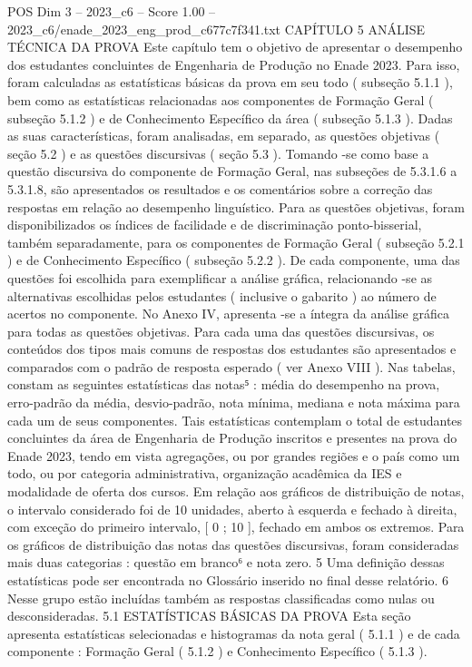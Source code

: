 \begin{textsample}{POS Dim 3 – 2023\_c6 – Score 1.00 – 2023\_c6/enade\_2023\_eng\_prod\_c677c7f341.txt}  \label{ex:f3_pos_110}
CAPÍTULO 5 ANÁLISE TÉCNICA DA PROVA Este capítulo tem o objetivo de apresentar o desempenho dos estudantes concluintes de Engenharia de Produção no Enade 2023.
Para isso, foram calculadas as estatísticas básicas da prova em seu todo ( subseção 5.1.1 ), bem como as estatísticas relacionadas aos componentes de Formação Geral ( subseção 5.1.2 ) e de Conhecimento Específico da área ( subseção 5.1.3 ).
Dadas as suas características, foram analisadas, em separado, as questões objetivas ( seção 5.2 ) e as questões discursivas ( seção 5.3 ).
Tomando -se como base a questão discursiva do componente de Formação Geral, nas subseções de 5.3.1.6 a 5.3.1.8, são apresentados os resultados e os comentários sobre a correção das respostas em relação ao desempenho linguístico.
Para as questões objetivas, foram disponibilizados os índices de facilidade e de discriminação ponto-bisserial, também separadamente, para os componentes de Formação Geral ( subseção 5.2.1 ) e de Conhecimento Específico ( subseção 5.2.2 ).
De cada componente, uma das questões foi escolhida para exemplificar a análise gráfica, relacionando -se as alternativas escolhidas pelos estudantes ( inclusive o gabarito ) ao número de acertos no componente.
No Anexo IV, apresenta -se a íntegra da análise gráfica para todas as questões objetivas.
Para cada uma das questões discursivas, os conteúdos dos tipos mais comuns de respostas dos estudantes são apresentados e comparados com o padrão de resposta esperado ( ver Anexo VIII ).
Nas tabelas, constam as seguintes estatísticas das notas⁵ : média do desempenho na prova, erro-padrão da média, desvio-padrão, nota mínima, mediana e nota máxima para cada um de seus componentes.
Tais estatísticas contemplam o total de estudantes concluintes da área de Engenharia de Produção inscritos e presentes na prova do Enade 2023, tendo em vista agregações, ou por grandes regiões e o país como um todo, ou por categoria administrativa, organização acadêmica da IES e modalidade de oferta dos cursos.
Em relação aos gráficos de distribuição de notas, o intervalo considerado foi de 10 unidades, aberto à esquerda e fechado à direita, com exceção do primeiro intervalo, [ 0 ; 10 ], fechado em ambos os extremos.
Para os gráficos de distribuição das notas das questões discursivas, foram consideradas mais duas categorias : questão em branco⁶ e nota zero. 5 Uma definição dessas estatísticas pode ser encontrada no Glossário inserido no final desse relatório. 6 Nesse grupo estão incluídas também as respostas classificadas como nulas ou desconsideradas. 5.1 ESTATÍSTICAS BÁSICAS DA PROVA Esta seção apresenta estatísticas selecionadas e histogramas da nota geral ( 5.1.1 ) e de cada componente : Formação Geral ( 5.1.2 ) e Conhecimento Específico ( 5.1.3 ).

\end{textsample}
